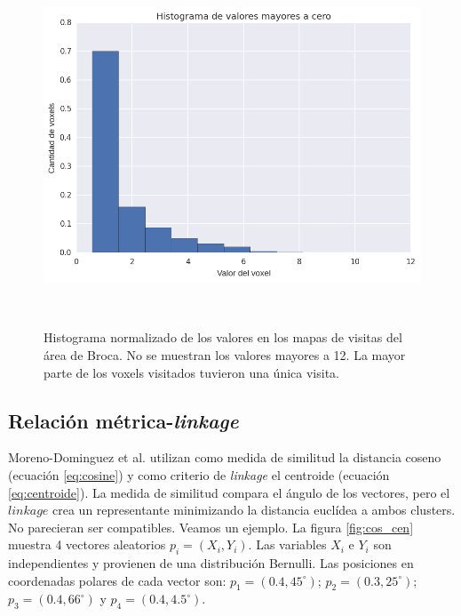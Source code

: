 \begin{figure}[h!]
              \centering                                                                                                          
\begin{minipage}[b]{0.8\textwidth}
    \includegraphics[width=\textwidth]{img/hist_tract.png}
    \caption{Histograma normalizado de los valores en los mapas de visitas
             del \'area de Broca. No se muestran los valores mayores a 12.
             La mayor parte de los voxels visitados tuvieron una \'unica
             visita.}
    \label{fig:hist_tract}
\end{minipage} ~

\end{figure}  


\subsection{Relaci\'on m\'etrica-\textit{linkage}}

Moreno-Dominguez et al. utilizan como medida de similitud la distancia
coseno (ecuaci\'on \ref{eq:cosine}) y como criterio de \textit{linkage} el
centroide (ecuaci\'on \ref{eq:centroide}). La medida de similitud 
compara el \'angulo de los vectores, pero el $linkage$ crea un 
representante minimizando la distancia eucl\'idea a ambos clusters. No
parecieran ser compatibles. Veamos un ejemplo. La figura \ref{fig:cos_cen}
muestra 4 vectores aleatorios $p_i = (X_i, Y_i)$. Las variables $X_i$ e
$Y_i$ son independientes y provienen de una distribuci\'on Bernulli. Las
posiciones en coordenadas polares de cada vector son: 
$ p_1 = (0.4, 45^\circ)$; $p_2 = (0.3, 25^\circ)$; $p_3 = (0.4, 66^\circ)$
y $p_4 = (0.4, 4.5^\circ)$. \\

